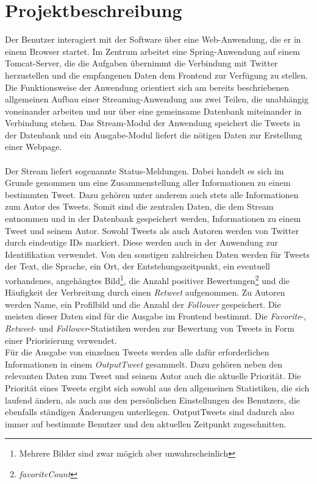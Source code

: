 \chapter{Projektbeschreibung}
Der Benutzer interagiert mit der Software über eine Web-Anwendung, die er in einem Browser startet. Im Zentrum arbeitet eine Spring-Anwendung auf einem Tomcat-Server, die die Aufgaben übernimmt die Verbindung mit Twitter herzustellen und die empfangenen Daten dem Frontend zur Verfügung zu stellen. Die Funktionsweise der Anwendung orientiert sich am bereits beschriebenen allgemeinen Aufbau einer Streaming-Anwendung aus zwei Teilen, die unabhängig voneinander arbeiten und nur über eine gemeinsame Datenbank miteinander in Verbindung stehen. Das Stream-Modul der Anwendung speichert die Tweets in der Datenbank und ein Ausgabe-Modul liefert die nötigen Daten zur Erstellung einer Webpage.
\\\\
Der Stream liefert sogenannte Status-Meldungen. Dabei handelt es sich im Grunde genommen um eine Zusammenstellung aller Informationen zu einem bestimmten Tweet. Dazu gehören unter anderem auch stets alle Informationen zum Autor des Tweets. Somit sind die zentralen Daten, die dem Stream entnommen und in der Datenbank gespeichert werden, Informationen zu einem Tweet und seinem Autor. Sowohl Tweets als auch Autoren werden von Twitter durch eindeutige IDs markiert. Diese werden auch in der Anwendung zur Identifikation verwendet. Von den sonstigen zahlreichen Daten werden für Tweets der Text, die Sprache, ein Ort, der Entstehungszeitpunkt, ein eventuell vorhandenes, angehängtes Bild\footnote{Mehrere Bilder sind zwar mögich aber unwahrscheinlich}, die Anzahl positiver Bewertungen\footnote{\textit{favoriteCount}} und die Häufigkeit der Verbreitung durch einen \textit{Retweet} aufgenommen. Zu Autoren werden Name, ein Profilbild und die Anzahl der \textit{Follower} gespeichert. Die meisten dieser Daten sind für die Ausgabe im Frontend bestimmt. Die \textit{Favorite}-, \textit{Retweet}- und \textit{Follower}-Statistiken werden zur Bewertung von Tweets in Form einer Priorisierung verwendet. \\
Für die Ausgabe von einzelnen Tweets werden alle dafür erforderlichen Informationen in einem \textit{OutputTweet} gesammelt. Dazu gehören neben den relevanten Daten zum Tweet und seinem Autor auch die aktuelle Priorität. Die Priorität eines Tweets ergibt sich sowohl aus den allgemeinen Statistiken, die sich laufend ändern, als auch aus den persönlichen Einstellungen des Benutzers, die ebenfalls ständigen Änderungen unterliegen. OutputTweets sind dadurch also immer auf bestimmte Benutzer und den aktuellen Zeitpunkt zugeschnitten.
